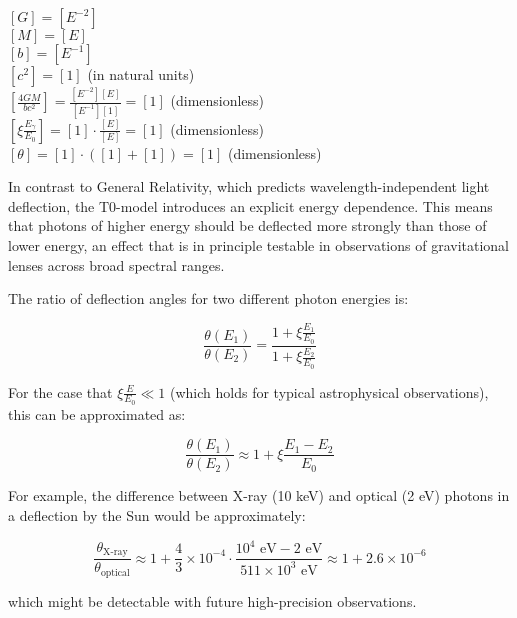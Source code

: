 \documentclass[12pt,a4paper]{article}
\theoremstyle{definition}
\begin{document}
	\begin{einheitencheck}
		$[G] = [E^{-2}]$\\
		$[M] = [E]$\\
		$[b] = [E^{-1}]$\\
		$[c^2] = [1]$ (in natural units)\\
		$[\frac{4GM}{bc^2}] = \frac{[E^{-2}][E]}{[E^{-1}][1]} = [1]$ (dimensionless)\\
		$[\xi \frac{E_\gamma}{E_0}] = [1] \cdot \frac{[E]}{[E]} = [1]$ (dimensionless)\\
		$[\theta] = [1] \cdot ([1] + [1]) = [1]$ (dimensionless) \checkmark
	\end{einheitencheck}
	
	\begin{wichtig}
		In contrast to General Relativity, which predicts wavelength-independent light deflection, the T0-model introduces an explicit energy dependence. This means that photons of higher energy should be deflected more strongly than those of lower energy, an effect that is in principle testable in observations of gravitational lenses across broad spectral ranges.
	\end{wichtig}
	
	\begin{verhaltnis}
		The ratio of deflection angles for two different photon energies is:
		
		\begin{equation}
			\frac{\theta(E_1)}{\theta(E_2)} = \frac{1 + \xi \frac{E_1}{E_0}}{1 + \xi \frac{E_2}{E_0}}
		\end{equation}
		
		For the case that $\xi \frac{E}{E_0} \ll 1$ (which holds for typical astrophysical observations), this can be approximated as:
		
		\begin{equation}
			\frac{\theta(E_1)}{\theta(E_2)} \approx 1 + \xi \frac{E_1 - E_2}{E_0}
		\end{equation}
		
		For example, the difference between X-ray (10 keV) and optical (2 eV) photons in a deflection by the Sun would be approximately:
		
		\begin{equation}
			\frac{\theta_{\text{X-ray}}}{\theta_{\text{optical}}} \approx 1 + \frac{4}{3} \times 10^{-4} \cdot \frac{10^4 \text{ eV} - 2 \text{ eV}}{511 \times 10^3 \text{ eV}} \approx 1 + 2.6 \times 10^{-6}
		\end{equation}
		
		which might be detectable with future high-precision observations.
	\end{verhaltnis}
	
\end{document}
